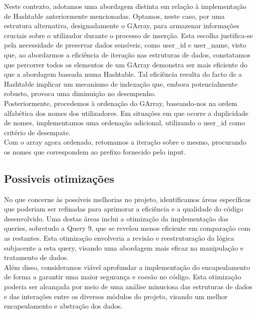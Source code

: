 \documentclass[12pt,a4paper]{article}
\begin{document}
    Neste contexto, adotamos uma abordagem distinta em relação à implementação de Hashtable anteriormente mencionadas. Optamos, neste caso, por uma estrutura alternativa, designadamente o GArray, para armazenar informações cruciais sobre o utilizador durante o processo de inserção. Esta escolha justifica-se pela necessidade de preservar dados sensíveis, como user\_id e user\_name, visto que, ao abordarmos a eficiência de iteração nas estruturas de dados, constatamos que percorrer todos os elementos de um GArray demonstra ser mais eficiente do que a abordagem baseada numa Hashtable. Tal eficiência resulta do facto de a Hashtable implicar um mecanismo de indexação que, embora potencialmente robusto, provoca uma diminuição no desempenho.\\

    Posteriormente, procedemos à ordenação do GArray, baseando-nos na ordem alfabética dos nomes dos utilizadores. Em situações em que ocorre a duplicidade de nomes, implementamos uma ordenação adicional, utilizando o user\_id como critério de desempate. \\
     
    Com o array agora ordenado, retomamos a iteração sobre o mesmo, procurando os nomes que correspondem ao prefixo fornecido pelo input.
        
    \subsection{Possiveis otimizações}
    \hspace{0,6cm}No que concerne às possíveis melhorias no projeto, identificamos áreas específicas que poderiam ser refinadas para aprimorar a eficiência e a qualidade do código desenvolvido. Uma destas áreas inclui a otimização da implementação das queries, sobretudo a Query 9, que se revelou menos eficiente em comparação com as restantes. Esta otimização envolveria a revisão e reestruturação da lógica subjacente a esta query, visando uma abordagem mais eficaz na manipulação e tratamento de dados.\\

    Além disso, consideramos viável aprofundar a implementação do encapsulamento de forma a garantir uma maior segurança e coesão no código. Esta otimização poderia ser alcançada por meio de uma análise minuciosa das estruturas de dados e das interações entre os diversos módulos do projeto, visando um melhor encapsulamento e abstração dos dados.\\
\end{document}
